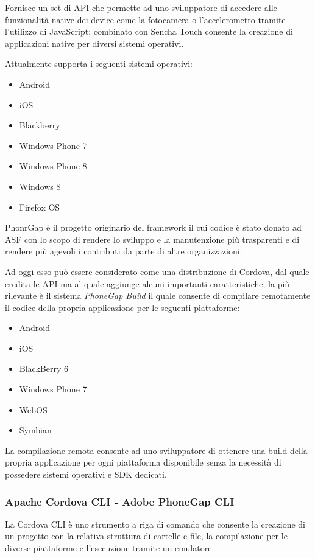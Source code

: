 Fornisce un set di \ac{API} che permette ad uno sviluppatore di accedere alle funzionalità native dei device come la fotocamera o l'accelerometro tramite l'utilizzo di JavaScript; combinato con Sencha Touch consente la creazione di applicazioni native per diversi sistemi operativi.

Attualmente supporta i seguenti sistemi operativi:
\begin{itemize}
\item Android
\item iOS
\item Blackberry
\item Windows Phone 7
\item Windows Phone 8
\item Windows 8
\item Firefox OS
\end{itemize}

PhonrGap è il progetto originario del framework il cui codice è stato donato ad \ac{ASF} con lo scopo di rendere lo sviluppo e la manutenzione più trasparenti e di rendere più agevoli i contributi da parte di altre organizzazioni.

Ad oggi esso può essere considerato come una distribuzione di Cordova, dal quale eredita le \ac{API} ma al quale aggiunge alcuni importanti caratteristiche; la più rilevante è il sistema \emph{PhoneGap Build} il quale consente di compilare remotamente il codice della propria applicazione per le seguenti piattaforme:
\begin{itemize}
\item Android
\item iOS
\item BlackBerry 6
\item Windows Phone 7
\item WebOS
\item Symbian
\end{itemize}

La compilazione remota consente ad uno sviluppatore di ottenere una build della propria applicazione per ogni piattaforma disponibile senza la necessità di possedere sistemi operativi e \ac{SDK} dedicati.

\subsubsection{Apache Cordova CLI - Adobe PhoneGap CLI}
La Cordova \ac{CLI} è uno strumento a riga di comando che consente la creazione di un progetto con la relativa struttura di cartelle e file, la compilazione per le diverse piattaforme e l'esecuzione tramite un emulatore.


